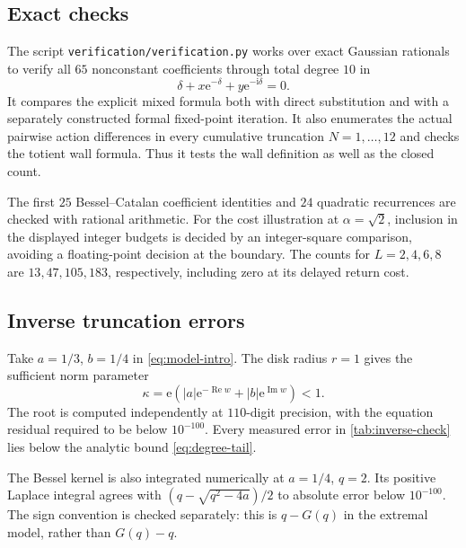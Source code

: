 \documentclass[11pt,a4paper]{article}
\numberwithin{equation}{section}
\theoremstyle{definition}
\theoremstyle{remark}
\newcommand{\ii}{\mathrm i}
\newcommand{\e}{\mathrm e}
\newcommand{\Rea}{\operatorname{Re}}
\newcommand{\Ima}{\operatorname{Im}}
\begin{document}
\subsection{Exact checks}

The script \texttt{verification/verification.py} works over exact
Gaussian rationals to verify all $65$ nonconstant coefficients
through total degree $10$ in
\[
 \delta+x\e^{-\delta}+y\e^{-\ii\delta}=0.
\]
It compares the explicit mixed formula both with direct substitution
and with a separately constructed formal fixed-point iteration.
It also enumerates the actual pairwise action differences in every
cumulative truncation $N=1,\ldots,12$ and checks the totient wall
formula. Thus it tests the wall definition as well as the closed count.

The first $25$ Bessel--Catalan coefficient identities and $24$
quadratic recurrences are checked with rational arithmetic.
For the cost illustration at $\alpha=\sqrt2$, inclusion in the
displayed integer budgets is decided by an integer-square
comparison, avoiding a floating-point decision at the boundary.
The counts for $L=2,4,6,8$ are $13,47,105,183$, respectively,
including zero at its delayed return cost.

\subsection{Inverse truncation errors}

Take $a=1/3$, $b=1/4$ in \eqref{eq:model-intro}. The disk radius
$r=1$ gives the sufficient norm parameter
\[
 \kappa=\e\left(|a|\e^{-\Rea w}+|b|\e^{\Ima w}\right)<1.
\]
The root is computed independently at $110$-digit precision,
with the equation residual required to be below $10^{-100}$.
Every measured error in \cref{tab:inverse-check} lies below
the analytic bound \eqref{eq:degree-tail}.

\begin{table}[htbp]
\centering
\small

\caption{Inverse truncation errors and the proven disk bound,
with $C=r=1$. Displayed measured errors are numerical values,
not rigorous intervals.}
\label{tab:inverse-check}
\end{table}

The Bessel kernel is also integrated numerically at $a=1/4$, $q=2$.
Its positive Laplace integral agrees with
$(q-\sqrt{q^2-4a})/2$ to absolute error below $10^{-100}$.
The sign convention is checked separately: this is $q-G(q)$
in the extremal model, rather than $G(q)-q$.
\end{document}
